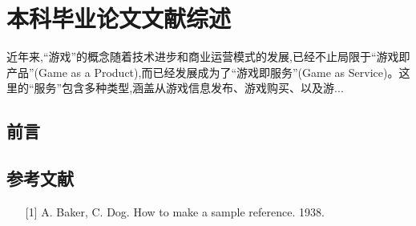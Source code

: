 {
\renewcommand{\baselinestretch}{1.25}\selectfont

{
  \titleformat{\chapter}[block]{\erhao\songti\bfseries\filcenter}{}{0em}{}{}
  \chapter{本科毕业论文文献综述}
}

近年来,“游戏”的概念随着技术进步和商业运营模式的发展,已经不止局限于“游戏即产品”(Game as a Product),而已经发展成为了“游戏即服务”(Game as Service)。这里的“服务”包含多种类型,涵盖从游戏信息发布、游戏购买、以及游...

\section{前言}

\section*{参考文献}

\begin{itemize}
\item [{[}1{]}] A. Baker, C. Dog. How to make a sample reference. 1938.
\end{itemize}
}

